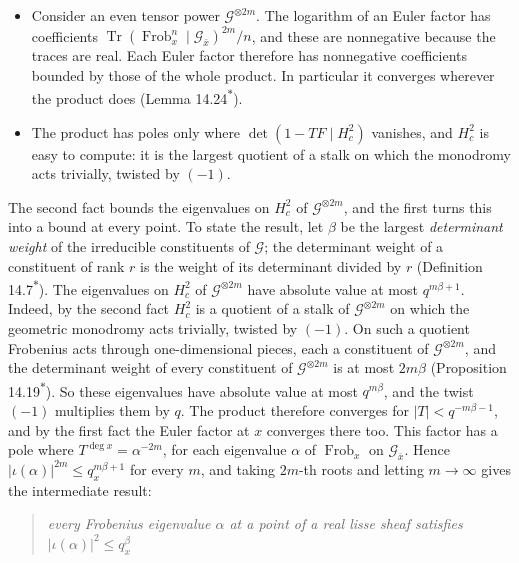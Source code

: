 \documentclass[11pt]{article}
\newcommand{\bpout}[1]{#1\textsuperscript{\hyperlink{bp-outside}{\ensuremath{\ast}}}}
\begin{document}
\begin{itemize}
\item Consider an even tensor power \(\mathcal G^{\otimes 2m}\). The logarithm of an Euler factor has coefficients \(\operatorname{Tr}(\operatorname{Frob}_x^n\mid\mathcal G_{\bar x})^{2m}/n\), and these are nonnegative because the traces are real. Each Euler factor therefore has nonnegative coefficients bounded by those of the whole product. In particular it converges wherever the product does (Lemma \bpout{14.24}).
\item The product has poles only where \(\det(1-TF\mid H^2_c)\) vanishes, and \(H^2_c\) is easy to compute: it is the largest quotient of a stalk on which the monodromy acts trivially, twisted by \((-1)\).
\end{itemize}

The second fact bounds the eigenvalues on \(H^2_c\) of \(\mathcal G^{\otimes2m}\), and the first turns this into a bound at every point. To state the result, let \(\beta\) be the largest \emph{determinant weight} of the irreducible constituents of \(\mathcal G\); the determinant weight of a constituent of rank \(r\) is the weight of its determinant divided by \(r\) (Definition \bpout{14.7}). The eigenvalues on \(H^2_c\) of \(\mathcal G^{\otimes2m}\) have absolute value at most \(q^{m\beta+1}\). Indeed, by the second fact \(H^2_c\) is a quotient of a stalk of \(\mathcal G^{\otimes2m}\) on which the geometric monodromy acts trivially, twisted by \((-1)\). On such a quotient Frobenius acts through one-dimensional pieces, each a constituent of \(\mathcal G^{\otimes2m}\), and the determinant weight of every constituent of \(\mathcal G^{\otimes2m}\) is at most \(2m\beta\) (Proposition \bpout{14.19}). So these eigenvalues have absolute value at most \(q^{m\beta}\), and the twist \((-1)\) multiplies them by \(q\). The product therefore converges for \(|T|<q^{-m\beta-1}\), and by the first fact the Euler factor at \(x\) converges there too. This factor has a pole where \(T^{\deg x}=\alpha^{-2m}\), for each eigenvalue \(\alpha\) of \(\operatorname{Frob}_x\) on \(\mathcal G_{\bar x}\). Hence \(|\iota(\alpha)|^{2m}\le q_x^{m\beta+1}\) for every \(m\), and taking \(2m\)-th roots and letting \(m\to\infty\) gives the intermediate result:

\begin{quote}
\emph{every Frobenius eigenvalue \(\alpha\) at a point of a real lisse sheaf satisfies \(|\iota(\alpha)|^2\le q_x^\beta\)}
\end{quote}
\end{document}
